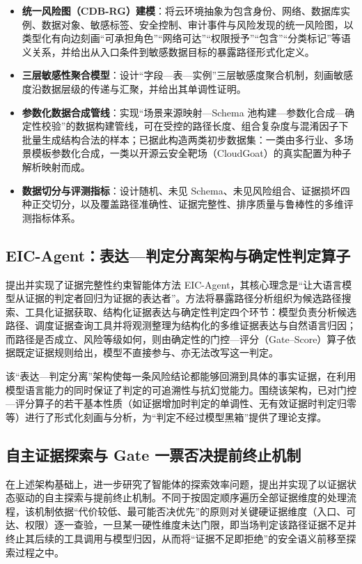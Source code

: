 \documentclass[a4paper,12pt]{ctexart}
\begin{document}
\begin{itemize}[leftmargin=2.2em,itemsep=2pt]
  \item \textbf{统一风险图（CDB-RG）建模}：将云环境抽象为包含身份、网络、数据库实例、数据对象、敏感标签、安全控制、审计事件与风险发现的统一风险图，以类型化有向边刻画“可承担角色”“网络可达”“权限授予”“包含”“分类标记”等语义关系，并给出从入口条件到敏感数据目标的暴露路径形式化定义。
  \item \textbf{三层敏感性聚合模型}：设计“字段—表—实例”三层敏感度聚合机制，刻画敏感度沿数据层级的传递与汇聚，并给出其单调性证明。
  \item \textbf{参数化数据合成管线}：实现“场景来源映射—Schema 池构建—参数化合成—确定性校验”的数据构建管线，可在受控的路径长度、组合复杂度与混淆因子下批量生成结构合法的样本；已据此构造两类初步数据集：一类由多行业、多场景模板参数化合成，一类以开源云安全靶场（CloudGoat）的真实配置为种子解析映射而成。
  \item \textbf{数据切分与评测指标}：设计随机、未见 Schema、未见风险组合、证据损坏四种正交切分，以及覆盖路径准确性、证据完整性、排序质量与鲁棒性的多维评测指标体系。
\end{itemize}

\subsection{EIC-Agent：表达—判定分离架构与确定性判定算子}

提出并实现了证据完整性约束智能体方法 EIC-Agent，其核心理念是“让大语言模型从证据的判定者回归为证据的表达者”。方法将暴露路径分析组织为候选路径搜索、工具化证据获取、结构化证据表达与确定性判定四个环节：模型负责分析候选路径、调度证据查询工具并将观测整理为结构化的多维证据表达与自然语言归因；而路径是否成立、风险等级如何，则由确定性的门控—评分（Gate--Score）算子依据既定证据规则给出，模型不直接参与、亦无法改写这一判定。

该“表达—判定分离”架构使每一条风险结论都能够回溯到具体的事实证据，在利用模型语言能力的同时保证了判定的可追溯性与抗幻觉能力。围绕该架构，已对门控—评分算子的若干基本性质（如证据增加时判定的单调性、无有效证据时判定归零等）进行了形式化刻画与分析，为“判定不经过模型黑箱”提供了理论支撑。

\subsection{自主证据探索与 Gate 一票否决提前终止机制}

在上述架构基础上，进一步研究了智能体的探索效率问题，提出并实现了以证据状态驱动的自主探索与提前终止机制。不同于按固定顺序遍历全部证据维度的处理流程，该机制依据“代价较低、最可能否决优先”的原则对关键硬证据维度（入口、可达、权限）逐一查验，一旦某一硬性维度未达门限，即当场判定该路径证据不足并终止其后续的工具调用与模型归因，从而将“证据不足即拒绝”的安全语义前移至探索过程之中。
\end{document}
